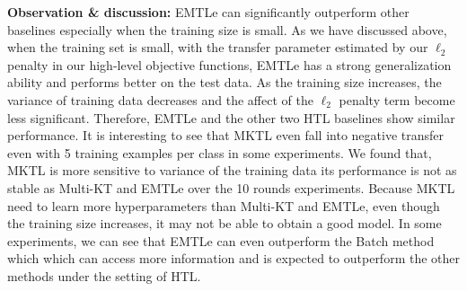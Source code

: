 \textbf{Observation \& discussion:} EMTLe can significantly outperform other baselines especially when the training size is small. %
As we have discussed above, when the training set is small, with the transfer parameter estimated by our $\ell_2$ penalty in our high-level objective functions, EMTLe has a strong generalization ability and performs better on the test data. As the training size increases, the variance of training data decreases and the affect of the $\ell_2$ penalty term become less significant. Therefore, EMTLe and the other two HTL baselines show similar performance. 
It is interesting to see that MKTL even fall into negative transfer even with 5 training examples per class in some experiments. We found that, MKTL is more sensitive to variance of the training data its performance is not as stable as Multi-KT and EMTLe over the 10 rounds experiments. Because MKTL need to learn more hyperparameters than Multi-KT and EMTLe, even though the training size increases, it may not be able to obtain a good model. 
In some experiments, we can see that EMTLe can even outperform the Batch method which which can access more information and is expected to outperform the other methods under the setting of HTL.